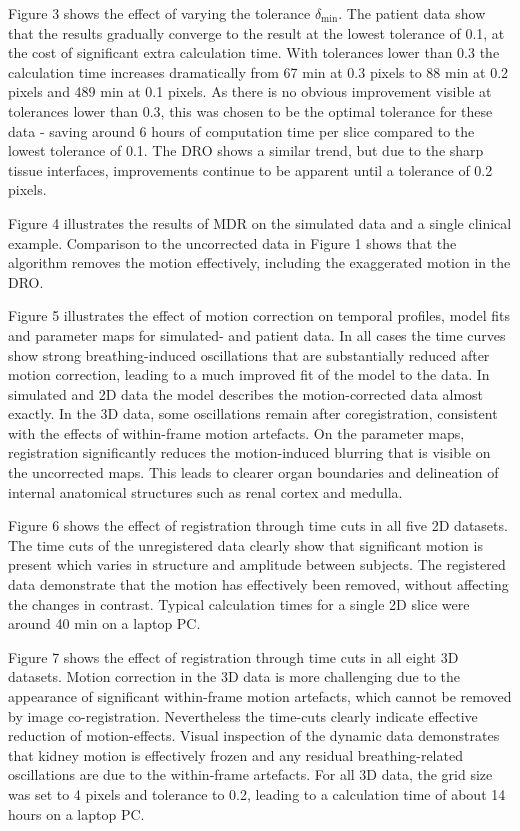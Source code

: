 \documentclass[num-refs]{wiley-article}
\begin{document}
Figure 3 shows the effect of varying the tolerance $\delta_\textrm{min}$. The patient data show that the results gradually converge to the result at the lowest tolerance of 0.1, at the cost of significant extra calculation time. With tolerances lower than 0.3 the calculation time increases dramatically from 67 min at 0.3 pixels to 88 min at 0.2 pixels and 489 min at 0.1 pixels. As there is no obvious improvement visible at tolerances lower than 0.3, this was chosen to be the optimal tolerance for these data - saving around 6 hours of computation time per slice compared to the lowest tolerance of 0.1. The DRO shows a similar trend, but due to the sharp tissue interfaces, improvements continue to be apparent until a tolerance of 0.2 pixels.

Figure 4 illustrates the results of MDR on the simulated data and a single clinical example. Comparison to the uncorrected data in Figure 1 shows that the algorithm removes the motion effectively, including the exaggerated motion in the DRO.

Figure 5 illustrates the effect of motion correction on temporal profiles, model fits and parameter maps for simulated- and patient data. In all cases the time curves show strong breathing-induced oscillations that are substantially reduced after motion correction, leading to a much improved fit of the model to the data. In simulated and 2D data the model describes the motion-corrected data almost exactly. In the 3D data, some oscillations remain after coregistration, consistent with the effects of within-frame motion artefacts. On the parameter maps, registration significantly reduces the motion-induced blurring that is visible on the uncorrected maps. This leads to clearer organ boundaries and delineation of internal anatomical structures such as renal cortex and medulla.

Figure 6 shows the effect of registration through time cuts in all five 2D datasets. The time cuts of the unregistered data clearly show that significant motion is present which varies in structure and amplitude between subjects. The registered data demonstrate that the motion has effectively been removed, without affecting the changes in contrast. Typical calculation times for a single 2D slice were around 40 min on a laptop PC.

Figure 7 shows the effect of registration through time cuts in all eight 3D datasets. Motion correction in the 3D data is more challenging due to the appearance of significant within-frame motion artefacts, which cannot be removed by image co-registration. Nevertheless the time-cuts clearly indicate effective reduction of motion-effects. Visual inspection of the dynamic data demonstrates that kidney motion is effectively frozen and any residual breathing-related oscillations are due to the within-frame artefacts. For all 3D data, the grid size was set to 4 pixels and tolerance to 0.2, leading to a calculation time of about 14 hours on a laptop PC.
\end{document}
